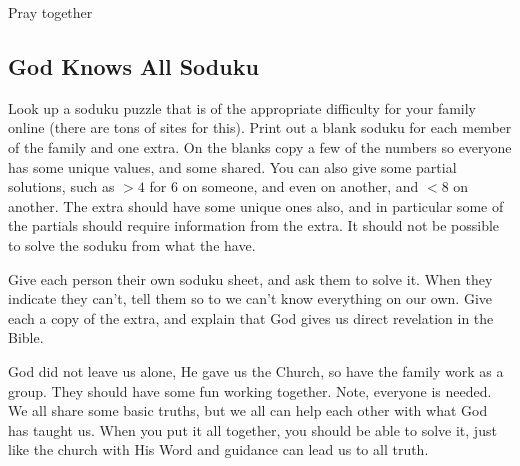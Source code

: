 \noindent Pray together

\subsection{God Knows All Soduku}

Look up a soduku puzzle that is of the appropriate difficulty for your family online (there are tons of sites for this).  Print out a blank soduku for each member of the family and one extra.  On the blanks copy a few of the numbers so everyone has some unique values, and some shared.  You can also give some partial solutions, such as $>4$ for 6 on someone, and even on another, and $<8$ on another.  The extra should have some unique ones also, and in particular some of the partials should require information from the extra.  It should not be possible to solve the soduku from what the have.

Give each person their own soduku sheet, and ask them to solve it.  When they indicate they can't, tell them so to we can't know everything on our own.  Give each a copy of the extra, and explain that God gives us direct revelation in the Bible.

God did not leave us alone, He gave us the Church, so have the family work as a group. They should have some fun working together.  Note, everyone is needed.  We all share some basic truths, but we all can help each other with what God has taught us.  When you put it all together, you should be able to solve it, just like the church with His Word and guidance can lead us to all truth.




